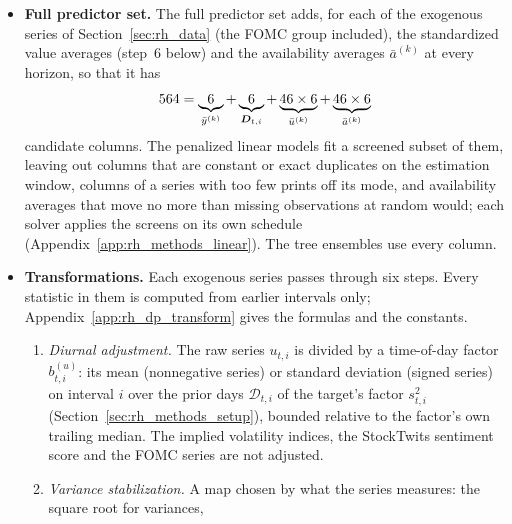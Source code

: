 \begin{itemize}
  same trailing averages of the winsorized target $\tilde y$ (\rhdmNHorizonsPooled{} columns), and the calendar vector
  $\bm D_{t,i}$ (\rhorNCalendarAf{} columns): five day-of-the-week dummies and the hour of the interval-end stamp,
  entered as an integer, not as a set of dummies. The estimation sample holds no overnight interval, so
  $\bm D_{t,i}$ has no overnight indicator; and every interval in it falls on a weekday, so the five dummies sum to one
  and are not identified separately from the intercept: the OLS fit is the minimum-norm least-squares solution
  (Appendix~\ref{app:rh_methods_linear}).
\item \textbf{Full predictor set.} The full predictor set adds, for each of the \rhdmNSeriesPooled{} exogenous series
  of Section~\ref{sec:rh_data} (the FOMC group included), the standardized value averages (step~6 below) and the
  availability averages $\bar a^{(k)}$ at every horizon, so that it has
  \[
    564 = \underbrace{6}_{\bar y^{(k)}}
      + \underbrace{6}_{\bm D_{t,i}}
      + \underbrace{46 \times 6}_{\bar u^{(k)}}
      + \underbrace{46 \times 6}_{\bar a^{(k)}}
  \]
  candidate columns. The penalized linear models fit a screened subset of them, leaving out columns that are
  constant or exact duplicates on the estimation window, columns of a series with too few prints off its mode, and
  availability averages that move no more than missing observations at random would; each solver applies the
  screens on its own schedule (Appendix~\ref{app:rh_methods_linear}). The tree ensembles use every column.
\item \textbf{Transformations.} Each exogenous series passes through six steps. Every statistic in them is computed
  from earlier intervals only; Appendix~\ref{app:rh_dp_transform} gives the formulas and the constants.
  \begin{enumerate}
  \item \emph{Diurnal adjustment.} The raw series $u_{t,i}$ is divided by a time-of-day factor $b^{(u)}_{t,i}$: its
    mean (nonnegative series) or standard deviation (signed series) on interval $i$ over the prior days
    $\mathcal{D}_{t,i}$ of the target's factor $s^2_{t,i}$ (Section~\ref{sec:rh_methods_setup}), bounded relative to
    the factor's own trailing median. The implied volatility indices, the StockTwits sentiment score and the FOMC
    series are not adjusted.
  \item \emph{Variance stabilization.} A map chosen by what the series measures: the square root for variances,

\end{enumerate}
\end{itemize}
